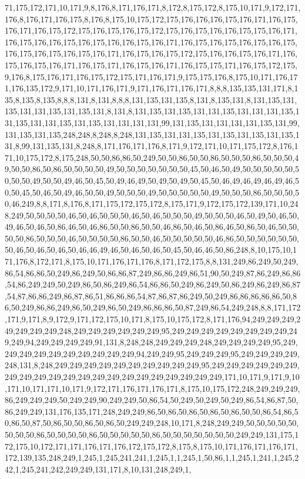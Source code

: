 71,175,172,171,10,171,9,8,176,8,171,176,171,8,172,8,175,172,8,175,10,171,9,172,171,176,8,176,171,176,175,8,176,8,175,10,175,172,175,176,176,176,175,176,171,176,175,176,171,176,175,172,175,176,175,176,175,172,175,176,175,176,176,175,175,176,171,176,175,176,176,175,176,175,176,176,175,176,171,176,175,176,175,176,175,176,175,176,175,176,175,176,175,176,171,176,175,176,175,172,175,176,176,175,176,171,176,175,176,175,176,171,176,175,171,176,175,176,171,176,175,175,171,176,175,172,175,9,176,8,175,176,171,176,175,172,175,171,176,171,9,175,175,176,8,175,10,171,176,171,176,135,172,9,171,10,171,176,171,9,171,176,171,176,171,8,8,8,135,135,131,171,8,135,8,135,8,135,8,8,8,131,8,131,8,8,8,131,135,131,135,8,131,8,135,131,8,131,135,131,135,131,131,135,131,135,131,8,131,8,131,135,131,135,131,131,135,131,131,131,135,131,135,131,131,135,131,135,131,131,131,131,99,131,135,131,131,131,131,135,131,99,131,135,131,135,248,248,8,248,8,248,131,135,131,131,135,131,135,131,135,131,135,131,8,99,131,135,131,8,248,8,171,176,171,176,8,171,9,172,171,10,171,175,172,8,176,171,10,175,172,8,175,248,50,50,86,86,50,249,50,50,86,50,50,86,50,50,50,86,50,50,50,49,50,50,86,50,86,50,50,50,50,49,50,50,50,50,50,50,50,45,50,46,50,49,50,50,50,50,50,50,50,50,49,50,50,49,46,50,45,50,49,46,49,50,49,50,49,50,45,50,46,49,46,49,46,49,46,50,50,45,50,46,50,49,46,50,50,49,50,50,50,49,50,50,50,50,50,49,50,50,50,86,50,50,50,50,46,249,8,8,171,8,176,8,171,175,172,175,172,8,175,171,9,172,175,172,139,171,10,248,249,50,50,50,50,46,50,46,50,50,50,46,50,46,50,50,50,49,50,50,50,46,50,49,50,46,50,49,46,50,46,50,86,46,50,46,86,50,50,86,50,50,46,86,50,46,50,86,46,50,86,50,46,50,50,50,50,86,50,50,50,46,50,50,50,50,86,50,50,46,50,50,50,50,50,46,86,50,50,50,50,50,50,50,46,50,46,50,46,50,46,46,49,46,50,46,50,46,50,45,50,46,46,50,86,248,8,10,175,10,171,176,8,172,171,8,175,10,171,176,171,176,8,171,172,175,8,8,131,249,86,249,50,249,86,54,86,86,50,249,86,249,50,86,86,87,249,86,86,249,86,51,90,50,249,87,86,249,86,86,54,86,249,249,50,249,86,50,86,249,86,54,86,86,50,249,86,249,50,86,249,86,249,86,87,54,87,86,86,249,86,87,86,51,86,86,86,54,87,86,87,86,249,50,249,86,86,86,86,86,50,86,50,249,86,86,249,86,50,249,86,50,249,86,86,86,50,87,249,86,54,249,248,8,8,171,172,171,9,171,8,9,172,9,171,172,175,10,171,8,175,10,175,172,8,171,176,94,249,249,249,249,249,249,249,248,249,249,249,249,249,249,95,249,249,249,249,249,249,249,249,249,249,94,249,249,249,249,91,131,8,248,248,249,249,249,248,249,249,249,249,95,249,249,249,249,249,249,249,249,249,249,94,249,249,95,249,249,249,95,249,249,249,249,248,131,8,248,249,249,249,249,249,249,249,249,249,249,95,249,249,249,249,249,249,249,249,249,249,249,249,249,249,249,249,249,249,249,249,249,171,10,171,9,171,9,10,171,10,171,171,10,171,9,172,171,176,171,176,171,8,175,10,175,172,248,249,249,249,86,249,249,249,50,249,249,90,249,249,50,86,54,50,249,50,249,50,249,86,54,86,87,50,86,249,249,131,176,135,171,248,249,249,86,50,86,50,86,50,86,50,86,50,50,86,54,86,50,86,50,87,50,86,50,50,86,50,86,50,249,249,248,10,171,8,248,249,249,50,50,50,50,50,50,50,50,86,50,50,50,50,86,50,50,50,50,50,86,50,50,50,50,50,50,50,249,249,131,175,172,175,10,172,171,171,176,171,176,172,175,172,8,175,8,175,10,171,176,171,176,171,172,139,135,248,249,1,245,1,245,241,241,1,245,1,1,245,1,50,86,1,1,245,1,241,1,245,242,1,245,241,242,249,249,131,171,8,10,131,248,249,1,
